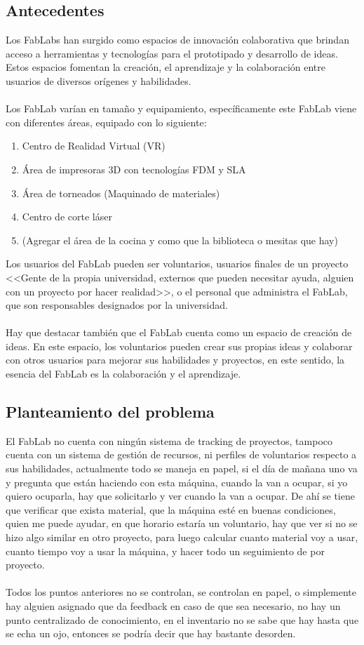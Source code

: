 \documentclass{article}
\begin{document}
\subsection{Antecedentes}
Los FabLabs han surgido como espacios de innovación colaborativa que brindan acceso a herramientas y tecnologías para el prototipado y desarrollo de ideas. Estos espacios fomentan la creación, el aprendizaje y la colaboración entre usuarios de diversos orígenes y habilidades.\\
\\
Los FabLab varían en tamaño y equipamiento, específicamente este FabLab viene con diferentes áreas, equipado con lo siguiente:
\begin{enumerate}
  \item Centro de Realidad Virtual (VR)
  \item Área de impresoras 3D con tecnologías FDM y SLA
  \item Área de torneados (Maquinado de materiales)
  \item Centro de corte láser
  \item (Agregar el área de la cocina y como que la biblioteca o mesitas que hay)
\end{enumerate}
Los usuarios del FabLab pueden ser voluntarios, usuarios finales de un proyecto <<Gente de la propia universidad, externos que pueden necesitar ayuda, alguien con un proyecto por hacer realidad>>, o el personal que administra el FabLab, que son responsables designados por la universidad.\\
\\
Hay que destacar también que el FabLab cuenta como un espacio de creación de ideas. En este espacio, los voluntarios pueden crear sus propias ideas y colaborar con otros usuarios para mejorar sus habilidades y proyectos, en este sentido, la esencia del FabLab es la colaboración y el aprendizaje.
\subsection{Planteamiento del problema}

El FabLab no cuenta con ningún sistema de tracking de proyectos, tampoco cuenta con un sistema de gestión de recursos, ni perfiles de voluntarios respecto a sus habilidades, actualmente todo se maneja en papel, si el día de mañana uno va y pregunta que están haciendo con esta máquina, cuando la van a ocupar, si yo quiero ocuparla, hay que solicitarlo y ver cuando la van a ocupar. De ahí se  tiene que verificar que exista material, que la máquina esté en buenas condiciones, quien me puede ayudar, en que horario estaría un voluntario, hay que ver si no se hizo algo similar en otro proyecto, para luego calcular cuanto material voy a usar, cuanto tiempo voy a usar la máquina, y hacer todo un seguimiento de por proyecto.\\
\\
Todos los puntos anteriores no se controlan, se controlan en papel, o simplemente hay alguien asignado que da feedback en caso de que sea necesario, no hay un punto centralizado de conocimiento, en el inventario no se sabe que hay hasta que se echa un ojo, entonces se podría decir que hay bastante desorden.
\end{document}

